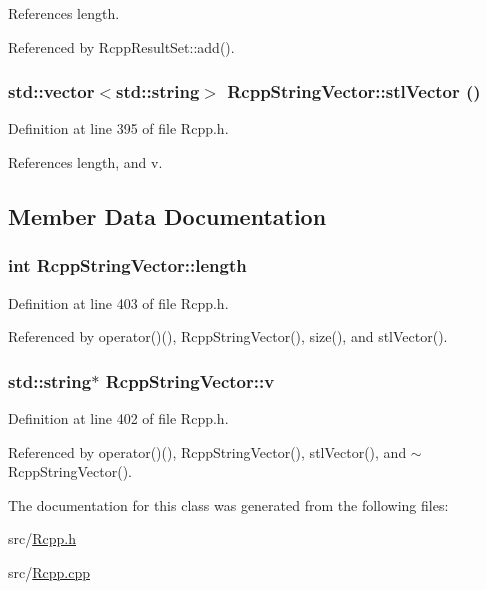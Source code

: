References length.

Referenced by RcppResultSet::add().\hypertarget{classRcppStringVector_a2bd817c9332e1446ddf034938b256cc3}{
\subsubsection[{stlVector}]{\setlength{\rightskip}{0pt plus 5cm}std::vector$<$std::string$>$ RcppStringVector::stlVector ()}}
\label{classRcppStringVector_a2bd817c9332e1446ddf034938b256cc3}


Definition at line 395 of file Rcpp.h.

References length, and v.

\subsection{Member Data Documentation}
\hypertarget{classRcppStringVector_aaa2e2e4335d14e46fc96b07836e99573}{
\subsubsection[{length}]{\setlength{\rightskip}{0pt plus 5cm}int {\bf RcppStringVector::length}}}
\label{classRcppStringVector_aaa2e2e4335d14e46fc96b07836e99573}


Definition at line 403 of file Rcpp.h.

Referenced by operator()(), RcppStringVector(), size(), and stlVector().\hypertarget{classRcppStringVector_a94d14fa5093cc8219cbcb91aadfed09e}{
\subsubsection[{v}]{\setlength{\rightskip}{0pt plus 5cm}std::string$\ast$ {\bf RcppStringVector::v}}}
\label{classRcppStringVector_a94d14fa5093cc8219cbcb91aadfed09e}


Definition at line 402 of file Rcpp.h.

Referenced by operator()(), RcppStringVector(), stlVector(), and $\sim$RcppStringVector().

The documentation for this class was generated from the following files:\begin{DoxyCompactItemize}
\item 
src/\hyperlink{Rcpp_8h}{Rcpp.h}\item 
src/\hyperlink{Rcpp_8cpp}{Rcpp.cpp}\end{DoxyCompactItemize}
